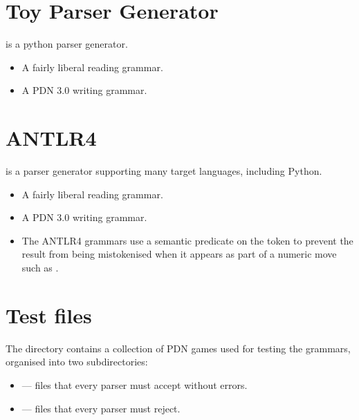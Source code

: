 \documentclass[letterpaper,10pt,english]{sphinxmanual}
\begin{document}
\section{Toy Parser Generator}
\label{\detokenize{implementation:toy-parser-generator}}
\sphinxAtStartPar
{} is a python parser generator.
\begin{itemize}
\item {} 
\sphinxAtStartPar
{} A fairly liberal reading grammar.

\item {} 
\sphinxAtStartPar
{} A PDN 3.0 writing grammar.

\end{itemize}


\section{ANTLR4}
\label{\detokenize{implementation:antlr4}}
\sphinxAtStartPar
{} is a parser generator supporting many target languages, including Python.
\begin{itemize}
\item {} 
\sphinxAtStartPar
{} A fairly liberal reading grammar.

\item {} 
\sphinxAtStartPar
{} A PDN 3.0 writing grammar.

\end{itemize}
\begin{itemize}
\item {} 
\sphinxAtStartPar
The ANTLR4 grammars use a semantic predicate on the  token to prevent
the result  from being mis\sphinxhyphen{}tokenised when it appears as part of a numeric
move such as .

\end{itemize}


\section{Test files}
\label{\detokenize{implementation:test-files}}
\sphinxAtStartPar
The  directory contains a collection of PDN games used for testing
the grammars, organised into two subdirectories:
\begin{itemize}
\item {} 
\sphinxAtStartPar
{} — files that every parser must accept without errors.

\item {} 
\sphinxAtStartPar
{} — files that every parser must reject.

\end{itemize}
\end{document}
